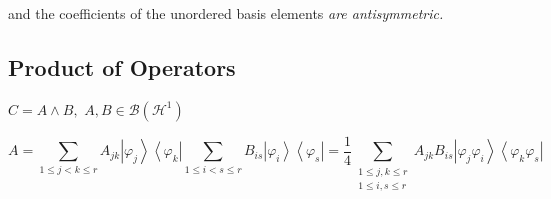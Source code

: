 \documentclass[aps,preprint]{revtex4}%
\begin{document}
and the coefficients of the unordered basis elements \emph{are antisymmetric.}

\subsection{Product of Operators}

$C=A\wedge B,$ $A,B\in\mathcal{B}\left(  \mathcal{H}^{1}\right)  $%

\begin{equation}
A=\sum_{1\leq j<k\leq r}A_{jk}\left\vert \varphi_{j}\right\rangle \left\langle
\varphi_{k}\right\vert \sum_{1\leq i<s\leq r}B_{is}\left\vert \varphi
_{i}\right\rangle \left\langle \varphi_{s}\right\vert =\frac{1}{4}%
\sum_{\substack{1\leq j,k\leq r\\1\leq i,s\leq r}}A_{jk}B_{is}\left\vert
\varphi_{j}\varphi_{i}\right\rangle \left\langle \varphi_{k}\varphi
_{s}\right\vert
\end{equation}
%
\end{document}
